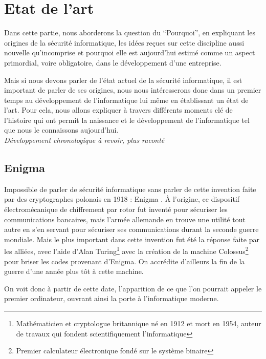 \documentclass[a4paper]{memoir}
\begin{document}
\chapter{Etat de l'art}%

Dans cette partie, nous aborderons la question du ``Pourquoi'', en expliquant les origines de la sécurité informatique, les idées reçues sur cette discipline aussi nouvelle qu'incomprise et pourquoi elle est aujourd'hui estimé comme un aspect primordial, voire obligatoire, dans le développement d'une entreprise.

\noindent Mais si nous devons parler de l'état actuel de la sécurité informatique, il est important de parler de ses origines, nous nous intéresserons donc dans un premier temps au développement de l'informatique lui même en établissant un état de l'art. Pour cela, nous allons expliquer à travers différents moments clé de l'histoire qui ont permit la naissance et le développement de l'informatique tel que nous le connaissons aujourd'hui.\\

\textit{Développement chronologique à revoir, plus raconté}


\section{Enigma}

Impossible de parler de sécurité informatique sans parler de cette invention faite par des cryptographes polonais en 1918 : Enigma .
À l'origine, ce dispositif électromécanique de chiffrement par rotor fut inventé pour sécuriser les communications bancaires, mais l'armée allemande en trouve une utilité tout autre en s'en servant pour sécuriser ses communications durant la seconde guerre mondiale. Mais le plus important dans cette invention fut été la réponse faite par les alliées, avec l'aide d'Alan Turing\footnote{Mathématicien et cryptologue britannique né en 1912 et mort en 1954, auteur de travaux qui fondent scientifiquement l'informatique} avec la création de la machine Colossus\footnote{Premier calculateur électronique fondé sur le système binaire} pour briser les codes provenant d'Enigma. On accrédite d'ailleurs la fin de la guerre d'une année plus tôt à cette machine.

On voit donc à partir de cette date, l'apparition de ce que l'on pourrait appeler le premier ordinateur, ouvrant ainsi la porte à l'informatique moderne.
\end{document}
